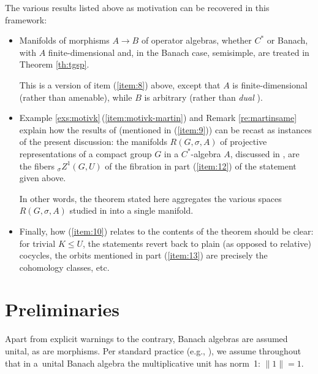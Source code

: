 \documentclass[10pt,a4paper]{amsart}
\numberwithin{equation}{section}
\begin{document}
The various results listed above as motivation can be recovered in this framework:
\begin{itemize}\itemsep=0pt
\item Manifolds of morphisms $A\to B$ of operator algebras, whether $C^*$ or Banach, with $A$ finite-dimensional and, in the Banach case, semisimple, are treated in Theorem \ref{th:tgsp}.

 This is a version of item (\ref{item:8}) above, except that $A$ is finite-dimensional (rather than amenable), while $B$ is arbitrary (rather than {\it dual} \cite[Theorem~8.2.3]{run-lec}).

\item Example \ref{exs:motivk}\,(\ref{item:motivk-martin}) and Remark \ref{re:martinsame} explain how the results of \cite{mart-proj} (mentioned in (\ref{item:9})) can be recast as instances of the present discussion: the manifolds $R(G,\sigma,A)$ of projective representations of a compact group $G$ in a $C^*$-algebra $A$, discussed in \cite[Section~1.4]{mart-proj}, are the fibers ${}_{\sigma}Z^1(G,U)$ of the fibration in part (\ref{item:12}) of the statement given above.

 In other words, the theorem stated here aggregates the various spaces $R(G,\sigma,A)$ studied in \cite{mart-proj} into a single manifold.

\item Finally, how (\ref{item:10}) relates to the contents of the theorem should be clear: for trivial $K\le U$, the statements revert back to plain (as opposed to relative) cocycles, the orbits mentioned in part (\ref{item:13}) are precisely the cohomology classes, etc.
\end{itemize}

\section{Preliminaries}\label{se.prel}

Apart from explicit warnings to the contrary, Banach algebras are assumed unital, as are morphisms. Per standard practice (e.g., \cite[Definition~2.1.8]{dales}), we assume throughout that in a~unital Banach algebra the multiplicative unit has norm~1: $\|1\|=1$.
\end{document}

